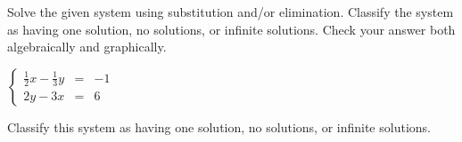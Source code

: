 \documentclass{ximera}
\author{Elizabeth Miller}
\begin{document}
Solve the given system using substitution and/or elimination. Classify the system as having one solution, no solutions, or infinite solutions. Check your answer both algebraically and graphically.

$\left\{ \begin{array}{rcr} \frac{1}{2}x-\frac{1}{3}y & = & -1  \\ [5pt] 2y-3x & = & 6 \end{array} \right.$ 

\begin{exercise}
Classify this system as having one solution, no solutions, or infinite solutions.
\begin{multipleChoice}  
\end{multipleChoice}  
\end{exercise}
\end{document}
